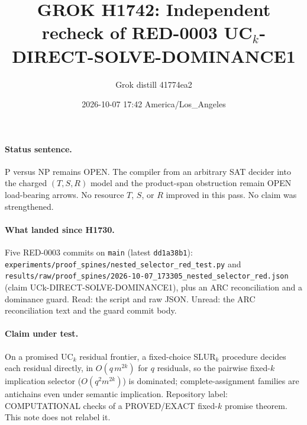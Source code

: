 \documentclass[11pt]{article}
\title{GROK H1742: Independent recheck of RED-0003 UC$_k$-DIRECT-SOLVE-DOMINANCE1}
\author{Grok distill 41774ea2}
\date{2026-10-07 17:42 America/Los\_Angeles}
\begin{document}
\maketitle
\paragraph{Status sentence.} P versus NP remains OPEN. The compiler from an arbitrary SAT decider into the charged $(T,S,R)$ model and the product-span obstruction remain OPEN load-bearing arrows. No resource $T$, $S$, or $R$ improved in this pass. No claim was strengthened.

\paragraph{What landed since H1730.} Five RED-0003 commits on \texttt{main} (latest \texttt{dd1a38b1}): \texttt{experiments/proof\_spines/nested\_selector\_red\_test.py} and \texttt{results/raw/proof\_spines/2026-10-07\_173305\_nested\_selector\_red.json} (claim UCk-DIRECT-SOLVE-DOMINANCE1), plus an ARC reconciliation and a dominance guard. Read: the script and raw JSON. Unread: the ARC reconciliation text and the guard commit body.

\paragraph{Claim under test.} On a promised UC$_k$ residual frontier, a fixed-choice SLUR$_k$ procedure decides each residual directly, in $O(q\,m^{2k})$ for $q$ residuals, so the pairwise fixed-$k$ implication selector ($O(q^2 m^{2k})$) is dominated; complete-assignment families are antichains even under semantic implication. Repository label: COMPUTATIONAL checks of a PROVED/EXACT fixed-$k$ promise theorem. This note does not relabel it.
\end{document}
